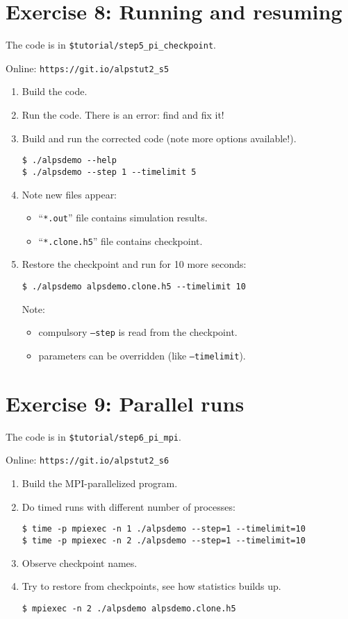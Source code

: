 \documentclass[12pt]{article}
\newcommand{\code}[1]{\texttt{#1}}
\begin{document}
\section*{Exercise 8: Running and resuming}

The code is in \texttt{\color{ballblue}\$tutorial/step5\_pi\_checkpoint}.

Online: \nolinkurl{https://git.io/alpstut2_s5}

\begin{enumerate}
\item Build the code.
\item Run the code. There is an error: find and fix it!
\item Build and run the corrected code (note more options available!).
  \begin{lstlisting}
$ ./alpsdemo --help
$ ./alpsdemo --step 1 --timelimit 5
  \end{lstlisting}
\item Note new files appear:
  \begin{itemize}
  \item  ``\code{*.out}'' file contains simulation results.
  \item  ``\code{*.clone.h5}'' file contains checkpoint.
  \end{itemize}
\item Restore the checkpoint and run for 10 more seconds:
  \begin{lstlisting}
$ ./alpsdemo alpsdemo.clone.h5 --timelimit 10 
\end{lstlisting} %
Note:
  \begin{itemize}
  \item compulsory \code{--step} is read from the checkpoint.
  \item parameters can be overridden (like \code{--timelimit}).
  \end{itemize}
\end{enumerate}


\section*{Exercise 9: Parallel runs}
\enlargethispage{1\baselineskip}
The code is in \texttt{\color{ballblue}\$tutorial/step6\_pi\_mpi}.

Online: \nolinkurl{https://git.io/alpstut2_s6}

\begin{enumerate}
\item Build the MPI-parallelized program.
\item Do timed runs with different number of processes:
  \begin{lstlisting}[emph={mpiexec}]
$ time -p mpiexec -n 1 ./alpsdemo --step=1 --timelimit=10
$ time -p mpiexec -n 2 ./alpsdemo --step=1 --timelimit=10
  \end{lstlisting} %
\item Observe checkpoint names.
\item Try to restore from checkpoints, see how statistics builds up.
  \begin{lstlisting}[emph={mpiexec}]
$ mpiexec -n 2 ./alpsdemo alpsdemo.clone.h5
\end{lstlisting} %
\end{enumerate}
\end{document}
